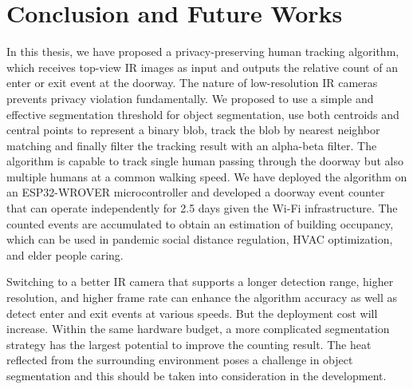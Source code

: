 \chapter{Conclusion and Future Works}
In this thesis, we have proposed a privacy-preserving human tracking algorithm, which receives top-view IR images as input and outputs the relative count of an enter or exit event at the doorway. The nature of low-resolution IR cameras prevents privacy violation fundamentally. We proposed to use a simple and effective segmentation threshold for object segmentation, use both centroids and central points to represent a binary blob, track the blob by nearest neighbor matching and finally filter the tracking result with an alpha-beta filter. The algorithm is capable to track single human passing through the doorway but also multiple humans at a common walking speed. We have deployed the algorithm on an ESP32-WROVER microcontroller and developed a doorway event counter that can operate independently for 2.5 days given the Wi-Fi infrastructure. The counted events are accumulated to obtain an estimation of building occupancy, which can be used in pandemic social distance regulation, HVAC optimization, and elder people caring.

Switching to a better IR camera that supports a longer detection range, higher resolution, and higher frame rate can enhance the algorithm accuracy as well as detect enter and exit events at various speeds. But the deployment cost will increase. Within the same hardware budget, a more complicated segmentation strategy has the largest potential to improve the counting result. The heat reflected from the surrounding environment poses a challenge in object segmentation and this should be taken into consideration in the development.
